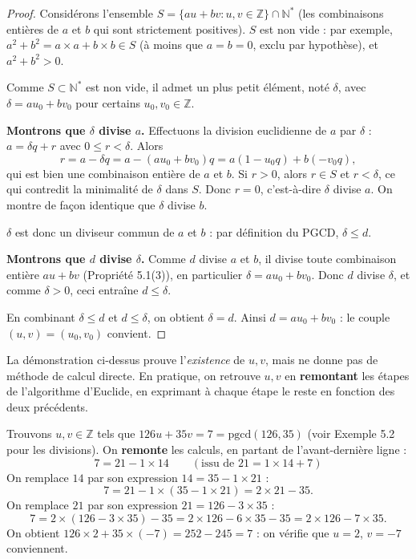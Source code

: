 \documentclass[a4paper,12pt,openany]{book}
\begin{document}
\begin{proof}
Considérons l'ensemble $S=\{au+bv : u,v\in\mathbb{Z}\} \cap \mathbb{N}^*$
(les combinaisons entières de $a$ et $b$ qui sont strictement positives).
$S$ est non vide : par exemple, $a^2+b^2 = a\times a+b\times b \in S$ (à
moins que $a=b=0$, exclu par hypothèse), et $a^2+b^2>0$.

Comme $S\subset\mathbb{N}^*$ est non vide, il admet un plus petit élément,
noté $\delta$, avec $\delta=au_0+bv_0$ pour certains $u_0,v_0\in\mathbb{Z}$.

\textbf{Montrons que $\delta$ divise $a$.} Effectuons la division
euclidienne de $a$ par $\delta$ : $a=\delta q+r$ avec $0\leq r<\delta$.
Alors
\[
r = a-\delta q = a - (au_0+bv_0)q = a(1-u_0q) + b(-v_0q),
\]
qui est bien une combinaison entière de $a$ et $b$. Si $r>0$, alors
$r\in S$ et $r<\delta$, ce qui contredit la minimalité de $\delta$ dans
$S$. Donc $r=0$, c'est-à-dire $\delta$ divise $a$. On montre de façon
identique que $\delta$ divise $b$.

$\delta$ est donc un diviseur commun de $a$ et $b$ : par définition du
PGCD, $\delta \leq d$.

\textbf{Montrons que $d$ divise $\delta$.} Comme $d$ divise $a$ et $b$, il
divise toute combinaison entière $au+bv$ (Propriété 5.1(3)), en
particulier $\delta=au_0+bv_0$. Donc $d$ divise $\delta$, et comme
$\delta>0$, ceci entraîne $d\leq\delta$.

En combinant $\delta\leq d$ et $d\leq\delta$, on obtient $\delta=d$. Ainsi
$d = au_0+bv_0$ : le couple $(u,v)=(u_0,v_0)$ convient.
\end{proof}

\begin{remarque}
La démonstration ci-dessus prouve l'\emph{existence} de $u,v$, mais ne
donne pas de méthode de calcul directe. En pratique, on retrouve $u,v$
en \textbf{remontant} les étapes de l'algorithme d'Euclide, en exprimant
à chaque étape le reste en fonction des deux précédents.
\end{remarque}

\begin{exemple}[5.3]
Trouvons $u,v\in\mathbb{Z}$ tels que $126u+35v=7=\mathrm{pgcd}(126,35)$
(voir Exemple 5.2 pour les divisions). On \textbf{remonte} les calculs, en
partant de l'avant-dernière ligne :
\[
7 = 21 - 1\times14 \qquad (\text{issu de } 21=1\times14+7)
\]
On remplace $14$ par son expression $14=35-1\times21$ :
\[
7 = 21 - 1\times(35-1\times21) = 2\times21 - 35.
\]
On remplace $21$ par son expression $21=126-3\times35$ :
\[
7 = 2\times(126-3\times35) - 35 = 2\times126 - 6\times35 - 35 =
2\times126 - 7\times35.
\]
On obtient $126\times2 + 35\times(-7) = 252-245=7$ : on vérifie que
$u=2$, $v=-7$ conviennent.
\end{exemple}
\end{document}
